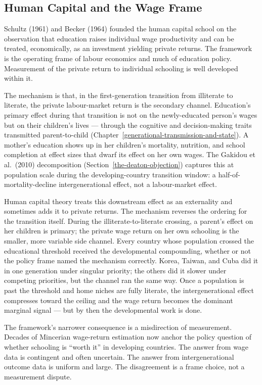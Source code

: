 \documentclass[12pt,letterpaper]{article}
\begin{document}
\subsection{Human Capital and the Wage Frame}\label{human-capital-and-the-wage-frame}

Schultz (1961) and Becker (1964) founded the human capital school on the observation that education raises individual wage productivity and can be treated, economically, as an investment yielding private returns. The framework is the operating frame of labour economics and much of education policy. Measurement of the private return to individual schooling is well developed within it.

The mechanism is that, in the first-generation transition from illiterate to literate, the private labour-market return is the secondary channel. Education's primary effect during that transition is not on the newly-educated person's wages but on their children's lives --- through the cognitive and decision-making traits transmitted parent-to-child (Chapter~\ref{generational-transmission-and-state}). A mother's education shows up in her children's mortality, nutrition, and school completion at effect sizes that dwarf its effect on her own wages. The Gakidou et al.\ (2010) decomposition (Section~\ref{the-deaton-objection}) captures this at population scale during the developing-country transition window: a half-of-mortality-decline intergenerational effect, not a labour-market effect.

Human capital theory treats this downstream effect as an externality and sometimes adds it to private returns. The mechanism reverses the ordering for the transition itself. During the illiterate-to-literate crossing, a parent's effect on her children is primary; the private wage return on her own schooling is the smaller, more variable side channel. Every country whose population crossed the educational threshold received the developmental compounding, whether or not the policy frame named the mechanism correctly. Korea, Taiwan, and Cuba did it in one generation under singular priority; the others did it slower under competing priorities, but the channel ran the same way. Once a population is past the threshold and home niches are fully literate, the intergenerational effect compresses toward the ceiling and the wage return becomes the dominant marginal signal --- but by then the developmental work is done.

The framework's narrower consequence is a misdirection of measurement. Decades of Mincerian wage-return estimation now anchor the policy question of whether schooling is ``worth it'' in developing countries. The answer from wage data is contingent and often uncertain. The answer from intergenerational outcome data is uniform and large. The disagreement is a frame choice, not a measurement dispute.
\end{document}
